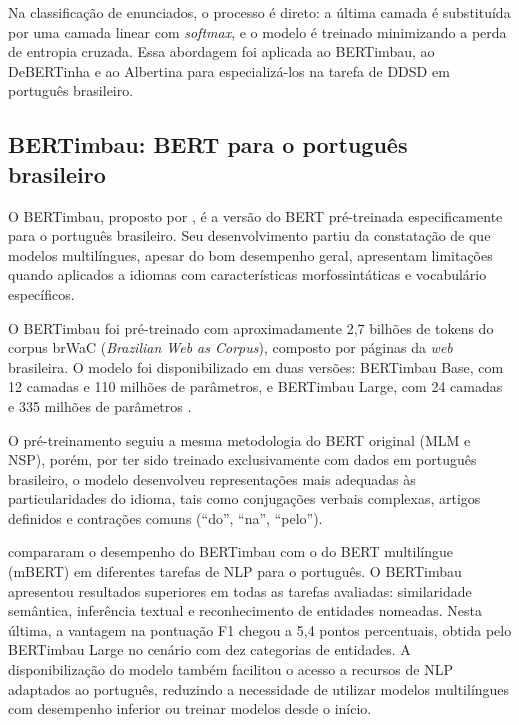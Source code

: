 \documentclass[
    12pt,                %
    openright,           %
    oneside,             %
    a4paper,             %
    english,             %
    brazil               %
]{abntex2}
\begin{document}
Na classificação de enunciados, o processo é direto: a última camada é substituída por uma camada linear com \textit{softmax}, e o modelo é treinado minimizando a perda de entropia cruzada. Essa abordagem foi aplicada ao BERTimbau, ao DeBERTinha e ao Albertina para especializá-los na tarefa de DDSD em português brasileiro.


\subsection{BERTimbau: BERT para o português brasileiro}

O BERTimbau, proposto por , é a versão do BERT pré-treinada especificamente para o português brasileiro. Seu desenvolvimento partiu da constatação de que modelos multilíngues, apesar do bom desempenho geral, apresentam limitações quando aplicados a idiomas com características morfossintáticas e vocabulário específicos.

O BERTimbau foi pré-treinado com aproximadamente 2,7 bilhões de tokens do corpus brWaC (\textit{Brazilian Web as Corpus}), composto por páginas da \textit{web} brasileira. O modelo foi disponibilizado em duas versões: BERTimbau Base, com 12 camadas e 110 milhões de parâmetros, e BERTimbau Large, com 24 camadas e 335 milhões de parâmetros \cite{Souza2020}.

O pré-treinamento seguiu a mesma metodologia do BERT original (MLM e NSP), porém, por ter sido treinado exclusivamente com dados em português brasileiro, o modelo desenvolveu representações mais adequadas às particularidades do idioma, tais como conjugações verbais complexas, artigos definidos e contrações comuns (``do'', ``na'', ``pelo'').

 compararam o desempenho do BERTimbau com o do BERT multilíngue (mBERT) em diferentes tarefas de NLP para o português. O BERTimbau apresentou resultados superiores em todas as tarefas avaliadas: similaridade semântica, inferência textual e reconhecimento de entidades nomeadas. Nesta última, a vantagem na pontuação F1 chegou a 5,4 pontos percentuais, obtida pelo BERTimbau Large no cenário com dez categorias de entidades. A disponibilização do modelo também facilitou o acesso a recursos de NLP adaptados ao português, reduzindo a necessidade de utilizar modelos multilíngues com desempenho inferior ou treinar modelos desde o início.

\end{document}

